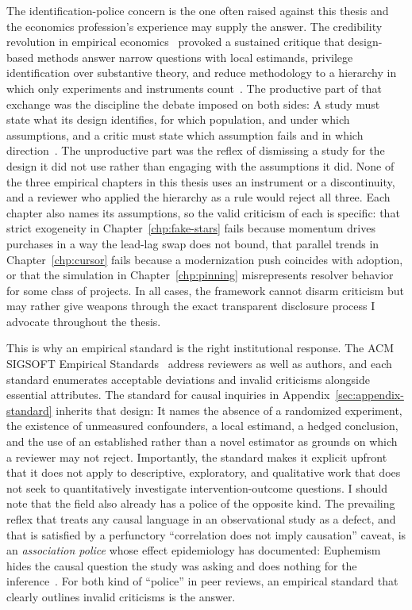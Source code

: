 The identification-police concern is the one often raised against this thesis and the economics profession's experience may supply the answer.
The credibility revolution in empirical economics~\cite{angrist2010credibility} provoked a sustained critique that design-based methods answer narrow questions with local estimands, privilege identification over substantive theory, and reduce methodology to a hierarchy in which only experiments and instruments count~\cite{deaton2010instruments, heckman2010comparing, deaton2018understanding}.
The productive part of that exchange was the discipline the debate imposed on both sides: A study must state what its design identifies, for which population, and under which assumptions, and a critic must state which assumption fails and in which direction~\cite{imbens2010better}.
The unproductive part was the reflex of dismissing a study for the design it did not use rather than engaging with the assumptions it did.
None of the three empirical chapters in this thesis uses an instrument or a discontinuity, and a reviewer who applied the hierarchy as a rule would reject all three.
Each chapter also names its assumptions, so the valid criticism of each is specific: that strict exogeneity in Chapter~\ref{chp:fake-stars} fails because momentum drives purchases in a way the lead-lag swap does not bound, that parallel trends in Chapter~\ref{chp:cursor} fails because a modernization push coincides with adoption, or that the simulation in Chapter~\ref{chp:pinning} misrepresents resolver behavior for some class of projects.
In all cases, the framework cannot disarm criticism but may rather give weapons through the exact transparent disclosure process I advocate throughout the thesis.

This is why an empirical standard is the right institutional response.
The ACM SIGSOFT Empirical Standards~\cite{DBLP:journals/corr/abs-2010-03525} address reviewers as well as authors, and each standard enumerates acceptable deviations and invalid criticisms alongside essential attributes.
The standard for causal inquiries in Appendix~\ref{sec:appendix-standard} inherits that design: It names the absence of a randomized experiment, the existence of unmeasured confounders, a local estimand, a hedged conclusion, and the use of an established rather than a novel estimator as grounds on which a reviewer may not reject.
Importantly, the standard makes it explicit upfront that it does not apply to descriptive, exploratory, and qualitative work that does not seek to quantitatively investigate intervention-outcome questions. 
I should note that the field also already has a police of the opposite kind.
The prevailing reflex that treats any causal language in an observational study as a defect, and that is satisfied by a perfunctory ``correlation does not imply causation'' caveat, is an \emph{association police} whose effect epidemiology has documented: Euphemism hides the causal question the study was asking and does nothing for the inference~\cite{hernan2018cword}.
For both kind of ``police'' in peer reviews, an empirical standard that clearly outlines invalid criticisms is the answer.

